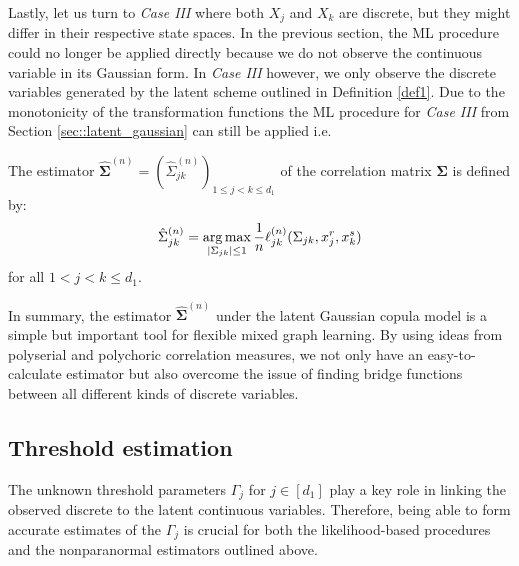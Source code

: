 Lastly, let us turn to \textit{Case III} where both $X_j$ and $X_k$ are discrete, but they might differ in their respective state spaces. In the previous section, the ML procedure could no longer be applied directly because we do not observe the continuous variable in its Gaussian form. In \textit{Case III} however, we only observe the discrete variables generated by the latent scheme outlined in Definition \ref{def1}. Due to the monotonicity of the transformation functions the ML procedure for \textit{Case III} from Section \ref{sec::latent_gaussian} can still be applied i.e.

\begin{definition}
    The estimator $\hat{\mathbf{\Sigma}}^{(n)} = (\hat{\Sigma}_{jk}^{(n)})_{1\leq j < k\leq d_1}$ of the correlation matrix $\mathbf{\Sigma}$ is defined by:
    \begin{equation}
            \hat{\Sigma}_{jk}^{(n)} = \argmax_{\Abs{\Sigma_{jk}} \leq 1} \frac{1}{n} \ell_{jk}^{(n)}(\Sigma_{jk}, x_j^r,x_k^s)
    \end{equation}
    for all $1 < j < k \leq d_1 $.
\end{definition}

In summary, the estimator $\hat{\mathbf{\Sigma}}^{(n)}$ under the latent Gaussian copula model is a simple but important tool for flexible mixed graph learning. By using ideas from polyserial and polychoric correlation measures, we not only have an easy-to-calculate estimator but also overcome the issue of finding bridge functions between all different kinds of discrete variables.

\subsection{Threshold estimation}\label{sec::thresholds}

The unknown threshold parameters $\Gamma_j$ for \(j \in [d_1]\) play a key role in linking the observed discrete to the latent continuous variables. Therefore, being able to form accurate estimates of the $\Gamma_j$ is crucial for both the likelihood-based procedures and the nonparanormal estimators outlined above.

